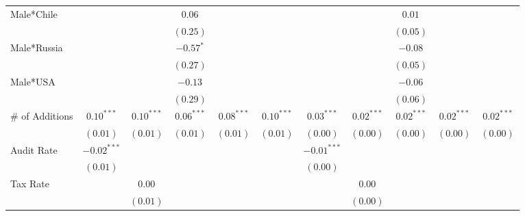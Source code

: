 \begin{table}
\begin{center}
\begin{tabular}{l c c c c c c c c c c }
Male*Chile         &               &              & $0.06$        &               &              &               &              & $0.01$        &               &              \\
                   &               &              & $(0.25)$      &               &              &               &              & $(0.05)$      &               &              \\
Male*Russia        &               &              & $-0.57^{*}$   &               &              &               &              & $-0.08$       &               &              \\
                   &               &              & $(0.27)$      &               &              &               &              & $(0.05)$      &               &              \\
Male*USA           &               &              & $-0.13$       &               &              &               &              & $-0.06$       &               &              \\
                   &               &              & $(0.29)$      &               &              &               &              & $(0.06)$      &               &              \\
\# of Additions    & $0.10^{***}$  & $0.10^{***}$ & $0.06^{***}$  & $0.08^{***}$  & $0.10^{***}$ & $0.03^{***}$  & $0.02^{***}$ & $0.02^{***}$  & $0.02^{***}$  & $0.02^{***}$ \\
                   & $(0.01)$      & $(0.01)$     & $(0.01)$      & $(0.01)$      & $(0.01)$     & $(0.00)$      & $(0.00)$     & $(0.00)$      & $(0.00)$      & $(0.00)$     \\
Audit Rate         & $-0.02^{***}$ &              &               &               &              & $-0.01^{***}$ &              &               &               &              \\
                   & $(0.01)$      &              &               &               &              & $(0.00)$      &              &               &               &              \\
Tax Rate           &               & $0.00$       &               &               &              &               & $0.00$       &               &               &              \\
                   &               & $(0.01)$     &               &               &              &               & $(0.00)$     &               &               &              \\

\end{tabular}
\end{center}
\end{table}
